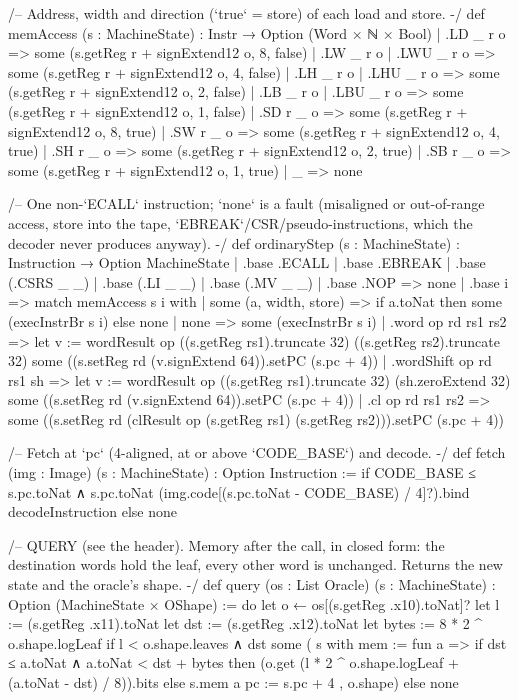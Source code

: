 \begin{leancode}[fontsize=\scriptsize,label={\footnotesize Contract/Machine.lean}]
/-- Address, width and direction (`true` = store) of each load and store. -/
def memAccess (s : MachineState) : Instr → Option (Word × ℕ × Bool)
  | .LD _ r o => some (s.getReg r + signExtend12 o, 8, false)
  | .LW _ r o | .LWU _ r o => some (s.getReg r + signExtend12 o, 4, false)
  | .LH _ r o | .LHU _ r o => some (s.getReg r + signExtend12 o, 2, false)
  | .LB _ r o | .LBU _ r o => some (s.getReg r + signExtend12 o, 1, false)
  | .SD r _ o => some (s.getReg r + signExtend12 o, 8, true)
  | .SW r _ o => some (s.getReg r + signExtend12 o, 4, true)
  | .SH r _ o => some (s.getReg r + signExtend12 o, 2, true)
  | .SB r _ o => some (s.getReg r + signExtend12 o, 1, true)
  | _ => none

/-- One non-`ECALL` instruction; `none` is a fault (misaligned or out-of-range access, store
into the tape, `EBREAK`/CSR/pseudo-instructions, which the decoder never produces anyway). -/
def ordinaryStep (s : MachineState) : Instruction → Option MachineState
  | .base .ECALL | .base .EBREAK | .base (.CSRS _ _) | .base (.LI _ _) | .base (.MV _ _)
  | .base .NOP => none
  | .base i =>
    match memAccess s i with
    | some (a, width, store) =>
      if a.toNat %
      then some (execInstrBr s i) else none
    | none => some (execInstrBr s i)
  | .word op rd rs1 rs2 =>
    let v := wordResult op ((s.getReg rs1).truncate 32) ((s.getReg rs2).truncate 32)
    some ((s.setReg rd (v.signExtend 64)).setPC (s.pc + 4))
  | .wordShift op rd rs1 sh =>
    let v := wordResult op ((s.getReg rs1).truncate 32) (sh.zeroExtend 32)
    some ((s.setReg rd (v.signExtend 64)).setPC (s.pc + 4))
  | .cl op rd rs1 rs2 => some ((s.setReg rd (clResult op (s.getReg rs1) (s.getReg rs2))).setPC (s.pc + 4))

/-- Fetch at `pc` (4-aligned, at or above `CODE_BASE`) and decode. -/
def fetch (img : Image) (s : MachineState) : Option Instruction :=
  if CODE_BASE ≤ s.pc.toNat ∧ s.pc.toNat %
    (img.code[(s.pc.toNat - CODE_BASE) / 4]?).bind decodeInstruction
  else none

/-- QUERY (see the header). Memory after the call, in closed form: the destination words hold
the leaf, every other word is unchanged. Returns the new state and the oracle's shape. -/
def query (os : List Oracle) (s : MachineState) : Option (MachineState × OShape) := do
  let o ← os[(s.getReg .x10).toNat]?
  let l := (s.getReg .x11).toNat
  let dst := (s.getReg .x12).toNat
  let bytes := 8 * 2 ^ o.shape.logLeaf
  if l < o.shape.leaves ∧ dst %
    some ({ s with
      mem := fun a => if dst ≤ a.toNat ∧ a.toNat < dst + bytes
        then (o.get (l * 2 ^ o.shape.logLeaf + (a.toNat - dst) / 8)).bits else s.mem a
      pc := s.pc + 4 }, o.shape)
  else none


\end{leancode}
